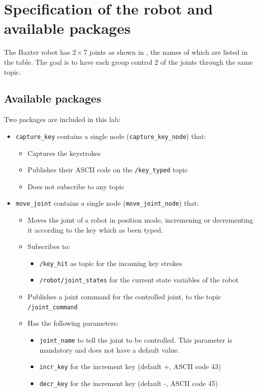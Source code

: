 \documentclass{ecnreport}
\begin{document}
\section{Specification of the robot and available packages}

The Baxter robot has $2\times 7$ joints as shown in , the names of which are listed in the table.
The goal is to have each group control 2 of the joints through the same topic.

\subsection{Available packages}

Two packages are included in this lab:
\begin{itemize}
 \item \texttt{capture\_key} contains a single node (\texttt{capture\_key\_node}) that:
 \begin{itemize}
  \item Captures the keystrokes
  \item Publishes their ASCII code on the \texttt{/key\_typed} topic
  \item Does not subscribe to any topic
 \end{itemize}
 \item \texttt{move\_joint} contains a single node (\texttt{move\_joint\_node}) that:
 \begin{itemize}
  \item Moves the joint of a robot in position mode, incremening or decrementing it according to the key which as been typed.
  \item Subscribes to:
  \begin{itemize}
   \item \texttt{/key\_hit} as topic for the incoming key strokes
   \item \texttt{/robot/joint\_states} for the current state variables of the robot
  \end{itemize}
  \item Publishes a joint command for the controlled joint, to the topic \texttt{/joint\_command}
  \item Has the following parameters:
  \begin{itemize}
   \item \texttt{joint\_name} to tell the joint to be controlled. This parameter is mandatory and does not have a default value.
   \item \texttt{incr\_key} for the increment key (default +, ASCII code 43)
   \item \texttt{decr\_key} for the increment key (default -, ASCII code 45)
  \end{itemize}
 \end{itemize}
\end{itemize}
\end{document}
